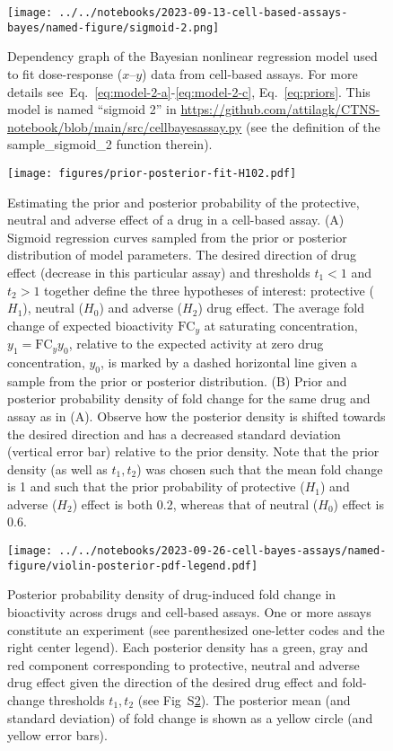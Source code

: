 \documentclass[letterpaper]{article}
\begin{document}
\begin{figure}[p]
\texttt{[image: ../../notebooks/2023-09-13-cell-based-assays-bayes/named-figure/sigmoid-2.png]}
\caption{Dependency graph of the Bayesian nonlinear regression model used to
  fit dose-response ($x$--$y$) data from cell-based assays.
  For more details see~Eq.~\ref{eq:model-2-a}-\ref{eq:model-2-c},
  Eq.~\ref{eq:priors}.  This model is named ``sigmoid 2'' in
  \url{https://github.com/attilagk/CTNS-notebook/blob/main/src/cellbayesassay.py}
  (see the definition of the sample\_sigmoid\_2 function therein).
}
\label{fig:model-2-plate}
\end{figure}


\begin{figure}[p]
\texttt{[image: figures/prior-posterior-fit-H102.pdf]}
\caption{Estimating the prior and posterior probability of the protective, neutral
  and adverse effect of a drug in a cell-based assay.  (A) Sigmoid regression
  curves sampled from the prior or posterior distribution of model parameters.
  The desired direction of drug effect (decrease in this particular assay) and
  thresholds $t_1<1$ and $t_2>1$ together define the three hypotheses of
  interest: protective ($H_1$), neutral ($H_0$) and adverse ($H_2$) drug
  effect.  The average fold change of expected bioactivity $\mathrm{FC}_y$ at
  saturating concentration, $y_1=\mathrm{FC}_y y_0$, relative to the expected activity
  at zero drug concentration, $y_0$, is marked by a dashed horizontal line
  given a sample from the prior or posterior distribution.  (B) Prior and
  posterior probability density of fold change for the same drug and assay as
  in (A).  Observe how the posterior density is shifted towards the desired
  direction and has a decreased standard deviation (vertical error bar)
  relative to the prior density.  Note that the prior density (as well as
  $t_1, t_2$) was chosen such
  that the mean fold change is 1 and such that the prior probability of
  protective ($H_1$) and adverse ($H_2$) effect is both 0.2, whereas that of
  neutral ($H_0$) effect is 0.6.
}
\label{fig:prior-posterior-fit-H102}
\end{figure}


\begin{figure}[p]
\texttt{[image: ../../notebooks/2023-09-26-cell-bayes-assays/named-figure/violin-posterior-pdf-legend.pdf]}
\caption{Posterior probability density of drug-induced fold change in bioactivity across
  drugs and cell-based assays.  One or more assays constitute an experiment
  (see parenthesized one-letter codes and the right center legend).  Each
  posterior density has a green, gray and red component corresponding to
  protective, neutral and adverse drug effect given the direction of the
  desired drug effect and fold-change thresholds $t_1, t_2$ (see
  Fig~S\ref{fig:prior-posterior-fit-H102}).  The posterior mean (and standard
  deviation) of fold change is shown as a yellow circle (and yellow error
  bars).
}
\label{fig:violin-posterior-assays}
\end{figure}
\end{document}
